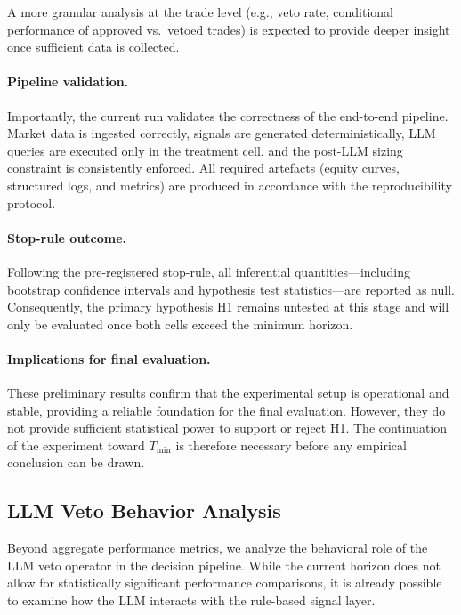 \documentclass{article}
\begin{document}
A more granular analysis at the trade level (e.g., veto rate, conditional performance of approved vs.\ vetoed trades) is expected to provide deeper insight once sufficient data is collected.

\paragraph{Pipeline validation.}
Importantly, the current run validates the correctness of the end-to-end pipeline. Market data is ingested correctly, signals are generated deterministically, LLM queries are executed only in the treatment cell, and the post-LLM sizing constraint is consistently enforced. All required artefacts (equity curves, structured logs, and metrics) are produced in accordance with the reproducibility protocol.

\paragraph{Stop-rule outcome.}
Following the pre-registered stop-rule, all inferential quantities---including bootstrap confidence intervals and hypothesis test statistics---are reported as null. Consequently, the primary hypothesis H1 remains untested at this stage and will only be evaluated once both cells exceed the minimum horizon.

\paragraph{Implications for final evaluation.}
These preliminary results confirm that the experimental setup is operational and stable, providing a reliable foundation for the final evaluation. However, they do not provide sufficient statistical power to support or reject H1. The continuation of the experiment toward $T_{\min}$ is therefore necessary before any empirical conclusion can be drawn.


\subsection{LLM Veto Behavior Analysis}

Beyond aggregate performance metrics, we analyze the behavioral role of the LLM veto operator in the decision pipeline. While the current horizon does not allow for statistically significant performance comparisons, it is already possible to examine how the LLM interacts with the rule-based signal layer.
\end{document}
